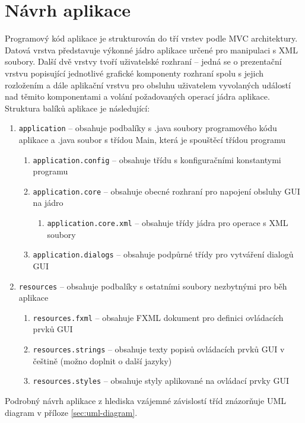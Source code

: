 \documentclass[onepage, a4paper, 12pt]{bakalarka}
\begin{document}
\section{Návrh aplikace}

Programový kód aplikace je strukturován do tří vrstev podle MVC architektury. Datová vrstva představuje výkonné jádro aplikace určené pro manipulaci s XML soubory. Další dvě vrstvy tvoří uživatelské rozhraní -- jedná se o prezentační vrstvu popisující jednotlivé grafické komponenty rozhraní spolu s jejich rozložením a dále aplikační vrstvu pro obsluhu uživatelem vyvolaných událostí nad těmito komponentami a volání požadovaných operací jádra aplikace. Struktura balíků aplikace je následující:
\begin{enumerate}
\item{\texttt{application} -- obsahuje podbalíky s .java soubory programového kódu aplikace a .java soubor s třídou Main, která je spouštěcí třídou programu}
\begin{enumerate}
\item{\texttt{application.config} -- obsahuje třídu s konfiguračními konstantymi programu}
\item{\texttt{application.core} -- obsahuje obecné rozhraní pro napojení obsluhy GUI na jádro}
\begin{enumerate}
\item{\texttt{application.core.xml} -- obsahuje třídy jádra pro operace s XML soubory}
\end{enumerate}
\item{\texttt{application.dialogs} -- obsahuje podpůrné třídy pro vytváření dialogů GUI}
\end{enumerate}
\item{\texttt{resources} -- obsahuje podbalíky s ostatními soubory nezbytnými pro běh aplikace}
\begin{enumerate}
\item{\texttt{resources.fxml} -- obsahuje FXML dokument pro definici ovládacích prvků GUI}
\item{\texttt{resources.strings} -- obsahuje texty popisů ovládacích prvků GUI v češtině (možno doplnit o další jazyky)}
\item{\texttt{resources.styles} -- obsahuje styly aplikované na ovládací prvky GUI}
\end{enumerate}
\end{enumerate}
Podrobný návrh aplikace z hlediska vzájemné závislostí tříd znázorňuje UML diagram v příloze \ref{sec:uml-diagram}.
\end{document}

